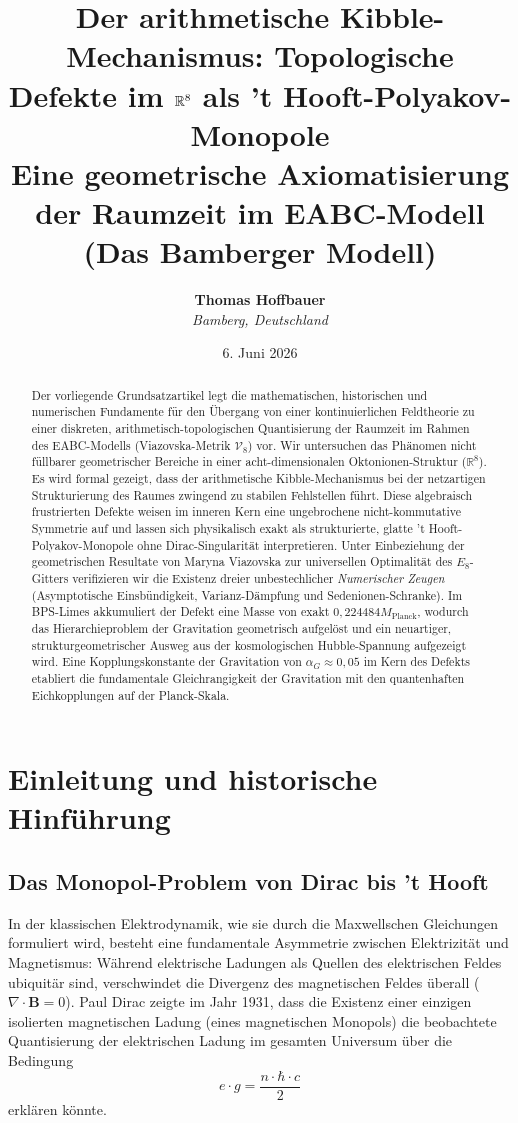 \documentclass[11pt,a4paper]{article}
\title{\textbf{Der arithmetische Kibble-Mechanismus: Topologische Defekte im $\R^8$ als 't Hooft-Polyakov-Monopole}\\
\large Eine geometrische Axiomatisierung der Raumzeit im EABC-Modell (Das Bamberger Modell)}
\author{\textbf{Thomas Hoffbauer} \\
\textit{Bamberg, Deutschland}}
\date{6. Juni 2026}
\newcommand{\R}{\mathbb{R}}
\newcommand{\Eoct}{E_8}
\newcommand{\Vmet}{\mathcal{V}_8}
\newcommand{\Mplanck}{M_{\text{Planck}}}
\begin{document}
\maketitle

\begin{abstract}
Der vorliegende Grundsatzartikel legt die mathematischen, historischen und numerischen Fundamente für den Übergang von einer kontinuierlichen Feldtheorie zu einer diskreten, arithmetisch-topologischen Quantisierung der Raumzeit im Rahmen des EABC-Modells (Viazovska-Metrik $\Vmet$) vor. Wir untersuchen das Phänomen nicht füllbarer geometrischer Bereiche in einer acht-dimensionalen Oktonionen-Struktur ($\R^8$). Es wird formal gezeigt, dass der arithmetische Kibble-Mechanismus bei der netzartigen Strukturierung des Raumes zwingend zu stabilen Fehlstellen führt. Diese algebraisch frustrierten Defekte weisen im inneren Kern eine ungebrochene nicht-kommutative Symmetrie auf und lassen sich physikalisch exakt als strukturierte, glatte 't Hooft-Polyakov-Monopole ohne Dirac-Singularität interpretieren. Unter Einbeziehung der geometrischen Resultate von Maryna Viazovska zur universellen Optimalität des $\Eoct$-Gitters verifizieren wir die Existenz dreier unbestechlicher \textit{Numerischer Zeugen} (Asymptotische Einsbündigkeit, Varianz-Dämpfung und Sedenionen-Schranke). Im BPS-Limes akkumuliert der Defekt eine Masse von exakt $0{,}224484 \Mplanck$, wodurch das Hierarchieproblem der Gravitation geometrisch aufgelöst und ein neuartiger, strukturgeometrischer Ausweg aus der kosmologischen Hubble-Spannung aufgezeigt wird. Eine Kopplungskonstante der Gravitation von $\alpha_G \approx 0{,}05$ im Kern des Defekts etabliert die fundamentale Gleichrangigkeit der Gravitation mit den quantenhaften Eichkopplungen auf der Planck-Skala.
\end{abstract}

\newpage

\section{Einleitung und historische Hinführung}

\subsection{Das Monopol-Problem von Dirac bis 't Hooft}
In der klassischen Elektrodynamik, wie sie durch die Maxwellschen Gleichungen formuliert wird, besteht eine fundamentale Asymmetrie zwischen Elektrizität und Magnetismus: Während elektrische Ladungen als Quellen des elektrischen Feldes ubiquitär sind, verschwindet die Divergenz des magnetischen Feldes überall ($\nabla \cdot \mathbf{B} = 0$). Paul Dirac zeigte im Jahr 1931, dass die Existenz einer einzigen isolierten magnetischen Ladung (eines magnetischen Monopols) die beobachtete Quantisierung der elektrischen Ladung im gesamten Universum über die Bedingung 
\begin{equation}
e \cdot g = \frac{n \cdot \hbar \cdot c}{2}
\end{equation}
erklären könnte. 
\end{document}
